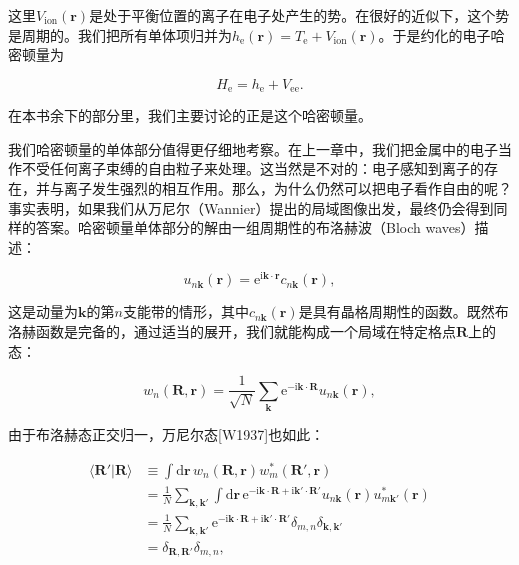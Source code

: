 这里$V_{\mathrm{ion}}(\mathbf r)$是处于平衡位置的离子在电子处产生的势。在很好的近似下，这个势是周期的。我们把所有单体项归并为$h_{\mathrm e}(\mathbf r)=T_{\mathrm e}+V_{\mathrm{ion}}(\mathbf r)$。于是约化的电子哈密顿量为

\begin{equation*}
H_{\mathrm e} = h_{\mathrm e} + V_{\mathrm{ee}}.
\tag{3.26}
\end{equation*}

在本书余下的部分里，我们主要讨论的正是这个哈密顿量。

我们哈密顿量的单体部分值得更仔细地考察。在上一章中，我们把金属中的电子当作不受任何离子束缚的自由粒子来处理。这当然是不对的：电子感知到离子的存在，并与离子发生强烈的相互作用。那么，为什么仍然可以把电子看作自由的呢？事实表明，如果我们从万尼尔（Wannier）提出的局域图像出发，最终仍会得到同样的答案。哈密顿量单体部分的解由一组周期性的布洛赫波（Bloch waves）描述：

\begin{equation*}
u_{n\mathbf k}(\mathbf r) = \mathrm e^{\mathrm i\mathbf k\cdot\mathbf r} c_{n\mathbf k}(\mathbf r),
\tag{3.27}
\end{equation*}

这是动量为$\mathbf k$的第$n$支能带的情形，其中$c_{n\mathbf k}(\mathbf r)$是具有晶格周期性的函数。既然布洛赫函数是完备的，通过适当的展开，我们就能构成一个局域在特定格点$\mathbf R$上的态：

\begin{equation*}
w_n(\mathbf R,\mathbf r) = \frac{1}{\sqrt N}\sum_{\mathbf k} \mathrm e^{-\mathrm i\mathbf k\cdot\mathbf R} u_{n\mathbf k}(\mathbf r),
\tag{3.28}
\end{equation*}

由于布洛赫态正交归一，万尼尔态[W1937]也如此：

\begin{align*}
\langle \mathbf R'|\mathbf R\rangle &\equiv \int \mathrm d\mathbf r\, w_n(\mathbf R,\mathbf r)w_m^{*}(\mathbf R',\mathbf r) \\
&= \frac{1}{N}\sum_{\mathbf k,\mathbf k'} \int \mathrm d\mathbf r\, \mathrm e^{-\mathrm i\mathbf k\cdot\mathbf R+\mathrm i\mathbf k'\cdot\mathbf R'} u_{n\mathbf k}(\mathbf r)u_{m\mathbf k'}^{*}(\mathbf r) \\
&= \frac{1}{N}\sum_{\mathbf k,\mathbf k'} \mathrm e^{-\mathrm i\mathbf k\cdot\mathbf R+\mathrm i\mathbf k'\cdot\mathbf R'} \delta_{m,n}\delta_{\mathbf k,\mathbf k'} \\
&= \delta_{\mathbf R,\mathbf R'}\delta_{m,n},
\tag{3.29}
\end{align*}

